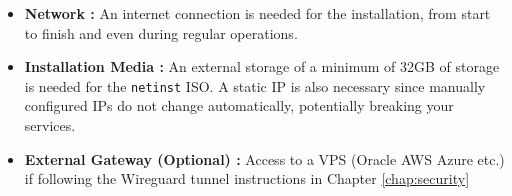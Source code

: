 \begin{itemize}
	\item \textbf{Network :} An internet connection is needed for the installation, from start to finish and even during regular operations.
	\item \textbf{Installation Media :} An external storage of a minimum of 32\unit{GB} of storage is needed for the \texttt{netinst} ISO. A static IP is also necessary since manually configured IPs do not change automatically, potentially breaking your services.
	\item \textbf{External Gateway (Optional) :} Access to a VPS (Oracle \/ AWS \/ Azure \/ etc.) if following the Wireguard tunnel instructions in {Chapter }\ref{chap:security}
	
	
	
\end{itemize}